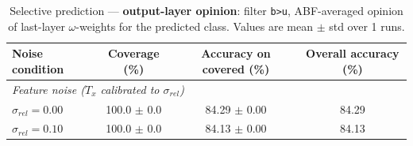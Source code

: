 \begin{table}[ht]
\centering
\caption{Selective prediction — \textbf{output-layer opinion}: filter \texttt{b>u}, ABF-averaged opinion of last-layer $\omega$-weights for the predicted class. Values are mean $\pm$ std over 1 runs.}
\label{tab:thresh-out-0-8}
\begin{tabular}{lccc}
\toprule
Noise condition & Coverage (\%) & Accuracy on covered (\%) & Overall accuracy (\%) \\
\midrule
\multicolumn{4}{l}{\textit{Feature noise ($T_x$ calibrated to $\sigma_{rel}$)}} \\
$\sigma_{rel}=0.00$ & 100.0 $\pm$ 0.0 & 84.29 $\pm$ 0.00 & 84.29 \\
$\sigma_{rel}=0.10$ & 100.0 $\pm$ 0.0 & 84.13 $\pm$ 0.00 & 84.13 \\
\bottomrule
\end{tabular}
\end{table}